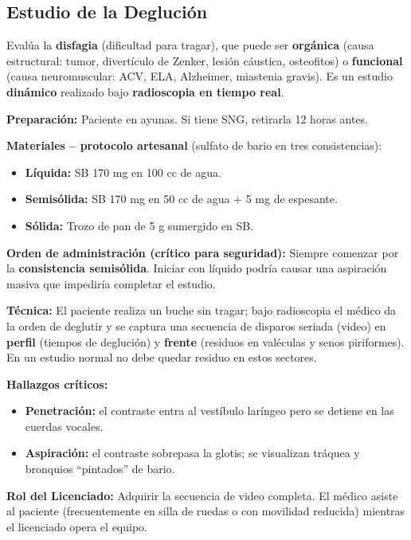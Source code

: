 \subsection*{Estudio de la Deglución}

Evalúa la \textbf{disfagia} (dificultad para tragar), que puede ser \textbf{orgánica} (causa estructural: tumor, divertículo de Zenker, lesión cáustica, osteofitos) o \textbf{funcional} (causa neuromuscular: ACV, ELA, Alzheimer, miastenia gravis). Es un estudio \textbf{dinámico} realizado bajo \textbf{radioscopia en tiempo real}.

\textbf{Preparación:} Paciente en ayunas. Si tiene SNG, retirarla 12 horas antes.

\textbf{Materiales -- protocolo artesanal} (sulfato de bario en tres consistencias):
\begin{itemize}[noitemsep]
	\item \textbf{Líquida:} SB 170 mg en 100 cc de agua.
	\item \textbf{Semisólida:} SB 170 mg en 50 cc de agua + 5 mg de espesante.
	\item \textbf{Sólida:} Trozo de pan de 5 g sumergido en SB.
\end{itemize}

\textbf{Orden de administración (crítico para seguridad):} Siempre comenzar por la \textbf{consistencia semisólida}. Iniciar con líquido podría causar una aspiración masiva que impediría completar el estudio.

\textbf{Técnica:} El paciente realiza un buche sin tragar; bajo radioscopia el médico da la orden de deglutir y se captura una secuencia de disparos seriada (video) en \textbf{perfil} (tiempos de deglución) y \textbf{frente} (residuos en valéculas y senos piriformes). En un estudio normal no debe quedar residuo en estos sectores.

\textbf{Hallazgos críticos:}
\begin{itemize}[noitemsep]
	\item \textbf{Penetración:} el contraste entra al vestíbulo laríngeo pero se detiene en las cuerdas vocales.
	\item \textbf{Aspiración:} el contraste sobrepasa la glotis; se visualizan tráquea y bronquios ``pintados'' de bario.
\end{itemize}

\textbf{Rol del Licenciado:} Adquirir la secuencia de video completa. El médico asiste al paciente (frecuentemente en silla de ruedas o con movilidad reducida) mientras el licenciado opera el equipo.

